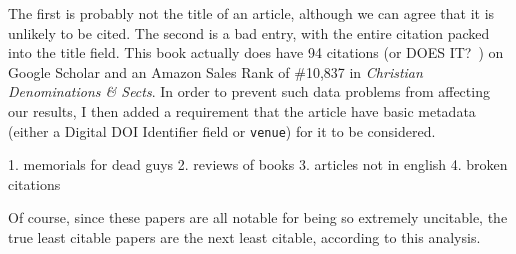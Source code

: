 \documentclass[twocolumn]{article}
\begin{document}

The first is probably not the title of an article, although we can
agree that it is unlikely to be cited. The second is a bad entry, with
the entire citation packed into the title field. This book actually
does have 94 citations (or DOES IT?~\cite{o1997thomas}) on Google
Scholar and an Amazon Sales Rank of \#10,837 in {\em Christian
  Denominations \& Sects}. In order to prevent such data problems from
affecting our results, I then added a requirement that the article
have basic metadata (either a Digital DOI Identifier field or {\tt venue})
for it to be considered.







1. memorials for dead guys
2. reviews of books
3. articles not in english
4. broken citations

\largeskip
Of course, since these papers are all notable for being so extremely
uncitable, the true least citable papers are the next least citable,
according to this analysis.

\end{document}
